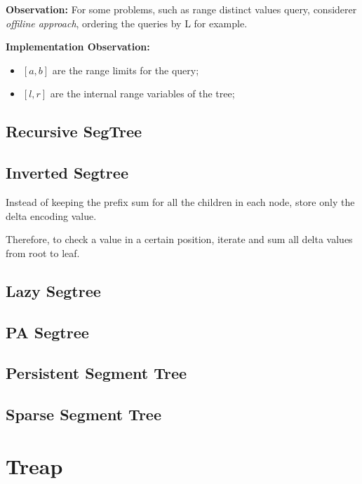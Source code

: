     \textbf{Observation:} For some problems, such as range distinct values query,
    considerer \textit{offiline approach}, ordering the queries by L for example. 

    \textbf{Implementation Observation:}
    \begin{itemize}
    \item $[a, b]$ are the range limits for the query;
    \item $[l, r]$ are the internal range variables of the tree;
    \end{itemize}

    \subsection{Recursive SegTree}



    \vspace{5pts}

    \subsection{Inverted Segtree}

        Instead of keeping the prefix sum for all the children in each node, store only the delta encoding value.

        Therefore, to check a value in a certain position, iterate and sum all delta values from root to leaf.


    \subsection{Lazy Segtree}


    \subsection{PA Segtree}


    \subsection{Persistent Segment Tree}


    \subsection{Sparse Segment Tree}

        
\section{Treap}


